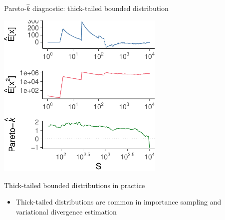 \documentclass[english,t]{beamer}
\begin{document}
\begin{frame}{Pareto-$\hat{k}$ diagnostic: thick-tailed bounded distribution}

  \includegraphics[width=8cm]{k6c.pdf}

\end{frame}

\begin{frame}{Thick-tailed bounded distributions in practice}

  \begin{itemize}
  \item Thick-tailed distributions are common in importance sampling
    and variational divergence estimation
      \vspace{0.25\baselineskip}
  \end{itemize}

\end{frame}

\end{document}
